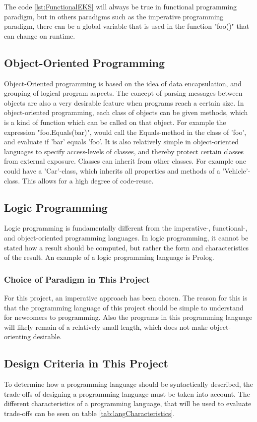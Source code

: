 The code \ref{lst:FunctionalEKS} will always be true in  functional programming paradigm, but in others paradigms such as the imperative programming paradigm, there can be a global variable that is used in the function "foo()" that can change on runtime.
\subsection{Object-Oriented Programming}
Object-Oriented programming is based on the idea of data encapsulation, and grouping of logical program aspects. The concept of parsing messages between objects are also a very desirable feature when programs reach a certain size. In object-oriented programming, each class of objects can be given methods, which is a kind of function which can be called on that object. For example the expression "foo.Equals(bar)", would call the Equals-method in the class of 'foo', and evaluate if 'bar' equals 'foo'. It is also relatively simple in object-oriented languages to specify access-levels of classes, and thereby protect certain classes from external exposure. Classes can inherit from other classes. For example one could have a 'Car'-class, which inherits all properties and methods of a 'Vehicle'-class. This allows for a high degree of code-reuse.

\subsection{Logic Programming}
Logic programming is fundamentally different from the imperative-, functional-, and object-oriented programming languages. In logic programming, it cannot be stated how a result should be computed, but rather the form and characteristics of the result. An example of a logic programming language is Prolog.

\subsubsection{Choice of Paradigm in This Project}
For this project, an imperative approach has been chosen. The reason for this is that the programming language of this project should be simple to understand for newcomers to programming. Also the programs in this programming language will likely remain of a relatively small length, which does not make object-orienting desirable.

\subsection{Design Criteria in This Project}
To determine how a programming language should be syntactically described, the trade-offs of designing a programming language must be taken into account. The different characteristics of a programming language, that will be used to evaluate trade-offs can be seen on table \ref{tab:langCharacteristics}.

